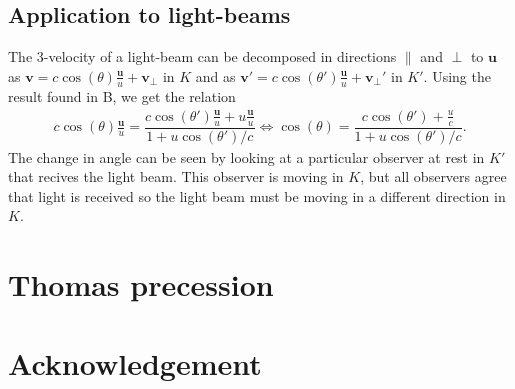 \documentclass[10pt, a4paper]{article}
\begin{document}
{\subsection{Application to light-beams}
The 3-velocity of a light-beam can be decomposed in directions $\parallel$ and $\perp$ to $\textbf{u}$ as $\textbf{v} = c \cos(\theta) \frac{\textbf{u}}{u} + \textbf{v}_{\perp}$ in $K$ and as $\textbf{v}' = c \cos(\theta') \frac{\textbf{u}}{u} + \textbf{v}_{\perp}'$ in $K'$. Using the result found in B, we get the relation 
\begin{align*}
    c \cos(\theta) \frac{\textbf{u}}{u} = \dfrac{c \cos(\theta') \frac{\textbf{u}}{u} + u\frac{\textbf{u}}{u}}{1 + u \cos(\theta')/c} \iff \cos(\theta) = \dfrac{c \cos(\theta') + \frac{u}{c}}{1 + u \cos(\theta')/c}.
\end{align*}
The change in angle can be seen by looking at a particular observer at rest in $K'$ that recives the light beam. This observer is moving in $K$, but all observers agree that light is received so the light beam must be moving in a different direction in $K$. 

\subsection{}
\subsection{}
\subsection{}

\section{Thomas precession}
\subsection{}
\subsection{}
\subsection{}
\subsection{}
\subsection{}
\subsection{}

\section{Acknowledgement}
}
\makereferences


\end{document}
